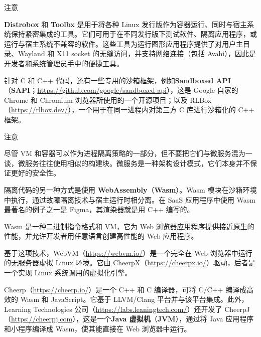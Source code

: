\begin{myNotic}{注意}

\label{idx:1124}
\label{idx:1125}
\textbf{Distrobox} 和 \textbf{Toolbx} 是用于将各种 Linux 发行版作为容器运行、同时与宿主系统保持紧密集成的工具。它们可用于在不同发行版下测试软件、隔离应用程序，或运行与宿主系统不兼容的软件。这些工具为运行图形应用程序提供了对用户主目录、Wayland 和 X11 socket 的无缝访问，并支持网络连接（包括 Avahi），因此是开发者和系统管理员手中的便捷工具。
\end{myNotic}

\label{idx:1126}
\label{idx:1127}
针对 C 和 C++ 代码，还有一些专用的沙箱框架，例如\textbf{Sandboxed API }（\textbf{SAPI}；\href{https://github.com/google/sandboxed-api}{https://github.com/google/sandboxed-api}），这是 Google 自家的 Chrome 和 Chromium 浏览器所使用的一个开源项目；以及 RLBox（\href{https://rlbox.dev/}{https://rlbox.dev/}），一个用于在同一进程内对第三方 C 库进行沙箱化的 C++ 框架。

\begin{myNotic}{注意}

尽管 VM 和容器可以作为进程隔离策略的一部分，但不要把它们与微服务混为一谈，微服务往往使用相似的构建块。微服务是一种架构设计模式，它们本身并不保证更好的安全性。
\end{myNotic}

\label{idx:1128}
隔离代码的另一种方式是使用 \textbf{WebAssembly}（\textbf{Wasm}）。Wasm 模块在沙箱环境中执行，通过故障隔离技术与宿主运行时相分离。在 SaaS 应用程序中使用 Wasm 最著名的例子之一是 Figma，其渲染器就是用 C++ 编写的。

Wasm 是一种二进制指令格式和 VM，它为 Web 浏览器应用程序提供接近原生的性能，并允许开发者用任意语言创建高性能的 Web 应用程序。

\label{idx:1129}
\label{idx:1130}
基于这项技术，WebVM（\href{https://webvm.io/}{https://webvm.io/}）是一个完全在 Web 浏览器中运行的无服务器虚拟 Linux 环境。它由 CheerpX（\href{https://cheerpx.io/}{https://cheerpx.io/}）驱动，后者是一个实现 Linux 系统调用的虚拟化引擎。

\label{idx:1131}
\label{idx:1132}
\label{idx:1133}
Cheerp（\href{https://cheerp.io/}{https://cheerp.io/}）是一个 C++ 和 C 编译器，可将 C/C++ 编译成高效的 Wasm 和 JavaScript。它基于 LLVM/Clang 平台并与该平台集成。此外，Learning Technologies 公司（\href{https://labs.leaningtech.com/}{https://labs.leaningtech.com/}）还开发了 CheerpJ（\href{https://cheerpj.com}{https://cheerpj.com}），这是一个\textbf{Java 虚拟机}（\textbf{JVM}），通过将 Java 应用程序和小程序编译成 Wasm，使其能直接在 Web 浏览器中运行。

